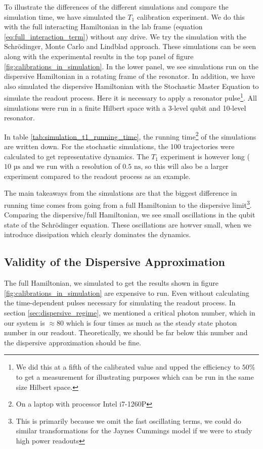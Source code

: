 To illustrate the differences of the different simulations and compare the simulation time, we have simulated the $T_1$ calibration experiment. We do this with the full interacting Hamiltonian in the lab frame (equation \ref{eq:full_interaction_term}) without any drive. We try the simulation with the Schrödinger, Monte Carlo and Lindblad approach. These simulations can be seen along with the experimental results in the top panel of figure \ref{fig:calibrations_in_simulation}. In the lower panel, we see simulations run on the dispersive Hamiltonian in a rotating frame of the resonator. In addition, we have also simulated the dispersive Hamiltonian with the Stochastic Master Equation to simulate the readout process. Here it is necessary to apply a resonator pulse\footnote{We did this at a fifth of the calibrated value and upped the efficiency to $50\%$ to get a measurement for illustrating purposes which can be run in the same size Hilbert space.}. All simulations were run in a finite Hilbert space with a 3-level qubit and 10-level resonator.

In table \ref{tab:simulation_t1_running_time}, the running time\footnote{On a laptop with processor Intel i7-1260P} of the simulations are written down. For the stochastic simulations, the 100 trajectories were calculated to get representative dynamics. The $T_1$ experiment is however long ($10 \text{ µs}$ and we run with a resolution of $0.5 \text{ ns}$, so this will also be a larger experiment compared to the readout process as an example. 

The main takeaways from the simulations are that the biggest difference in running time comes from going from a full Hamiltonian to the dispersive limit\footnote{This is primarily because we omit the fast oscillating terms, we could do similar transformations for the Jaynes Cummings model if we were to study high power readouts}. Comparing the dispersive/full Hamiltonian, we see small oscillations in the qubit state of the Schrödinger equation. These oscillations are  howver small, when we introduce dissipation which clearly dominates the dynamics.

\subsection{Validity of the Dispersive Approximation}
The full Hamiltonian, we simulated to get the results shown in figure \ref{fig:calibrations_in_simulation} are expensive to run. Even without calculating the time-dependent pulses necessary for simulating the readout process. In section \ref{sec:dispersive_regime}, we mentioned a critical photon number, which in our system is $\approx 80$ which is four times as much as the steady state photon number in our readout. Theoretically, we should be far below this number and the dispersive approximation should be fine.

